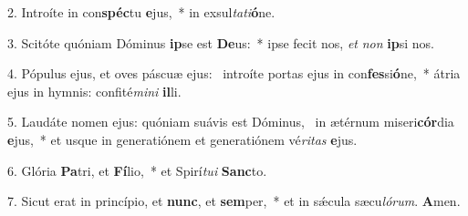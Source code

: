 2. Introíte in con\textbf{spéc}tu \textbf{e}jus,~*  in exsul\textit{ta}\textit{ti}\textbf{ó}ne.\

3. Scitóte quóniam Dóminus \textbf{ip}se est \textbf{De}us:~*  ipse fecit nos, \textit{et} \textit{non} \textbf{ip}si nos.\

4. Pópulus ejus, et oves páscuæ ejus: \dag\  introíte portas ejus in con\textbf{fes}si\textbf{ó}ne,~*  átria ejus in hymnis: confité\textit{mi}\textit{ni} \textbf{il}li.\

5. Laudáte nomen ejus: quóniam suávis est Dóminus, \dag\  in ætérnum miseri\textbf{cór}dia \textbf{e}jus,~*  et usque in generatiónem et generatiónem vé\textit{ri}\textit{tas} \textbf{e}jus.\

6. Glória \textbf{Pa}tri, et \textbf{Fí}lio,~*  et Spirí\textit{tu}\textit{i} \textbf{Sanc}to.\

7. Sicut erat in princípio, et \textbf{nunc}, et \textbf{sem}per,~*  et in sǽcula sæcu\textit{ló}\textit{rum}. \textbf{A}men.\

